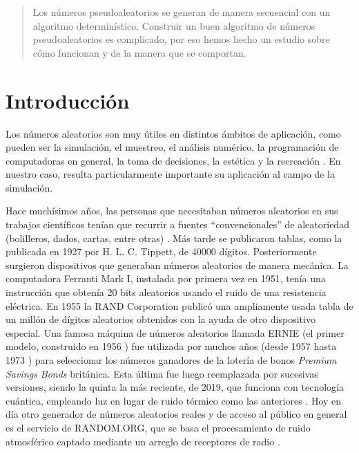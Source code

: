 \begin{abstract}
Los números pseudoaleatorios se generan de manera secuencial con un algoritmo determinístico. Construir un buen algoritmo de números pseudoaleatorios es complicado, por eso hemos hecho un estudio sobre cómo funcionan y de la manera que se comportan.
\end{abstract}




\section{Introducción}
Los números aleatorios son muy útiles en distintos ámbitos de aplicación, como pueden ser la simulación, el muestreo, el análisis numérico, la programación de computadoras en general, la toma de decisiones, la estética y la recreación \cite{knuth1997seminumerical}. En nuestro caso, resulta particularmente importante su aplicación al campo de la simulación.

Hace muchísimos años, las personas que necesitaban números aleatorios en sus trabajos científicos tenían que recurrir a fuentes ``convencionales'' de aleatoriedad (bolilleros, dados, cartas, entre otras) \cite{knuth1997seminumerical}. Más tarde se publicaron tablas, como la publicada en 1927 por H. L. C. Tippett, de 40000 dígitos. Posteriormente surgieron dispositivos que generaban números aleatorios de manera mecánica. La computadora Ferranti Mark I, instalada por primera vez en 1951, tenía una instrucción que obtenía 20 bits aleatorios usando el ruido de una resistencia eléctrica. En 1955 la RAND Corporation publicó una ampliamente usada tabla de un millón de dígitos aleatorios obtenidos con la ayuda de otro dispositivo especial. Una famosa máquina de números aleatorios llamada ERNIE (el primer modelo, construido en 1956 \cite{virtualernie}) fue utilizada por muchos años (desde 1957 hasta 1973 \cite{virtualernie}) para seleccionar los números ganadores de la lotería de bonos \emph{Premium Savings Bonds} británica. Esta última fue luego reemplazada por sucesivas versiones, siendo la quinta la más reciente, de 2019, que funciona con tecnología cuántica, empleando luz en lugar de ruido térmico como las anteriores \cite{virtualernie}. Hoy en día otro generador de números aleatorios reales y de acceso al público en general es el servicio de RANDOM.ORG, que se basa el procesamiento de ruido atmosférico captado mediante un arreglo de receptores de radio \cite{randomorgfaq}.

